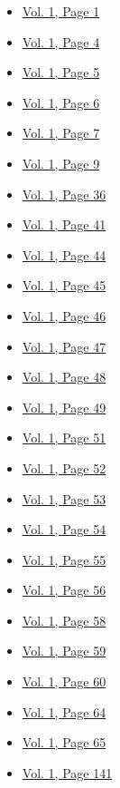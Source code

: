 \begin{itemize}
  \begin{itemize}
  \tightlist
  \item
    \protect\hyperlink{g-page-9}{Vol. 1, Page 1}
  \item
    \protect\hyperlink{g-page-12}{Vol. 1, Page 4}
  \item
    \protect\hyperlink{g-page-13}{Vol. 1, Page 5}
  \item
    \protect\hyperlink{g-page-14}{Vol. 1, Page 6}
  \item
    \protect\hyperlink{g-page-15}{Vol. 1, Page 7}
  \item
    \protect\hyperlink{g-page-17}{Vol. 1, Page 9}
  \item
    \protect\hyperlink{g-page-44}{Vol. 1, Page 36}
  \item
    \protect\hyperlink{g-page-49}{Vol. 1, Page 41}
  \item
    \protect\hyperlink{g-page-52}{Vol. 1, Page 44}
  \item
    \protect\hyperlink{g-page-53}{Vol. 1, Page 45}
  \item
    \protect\hyperlink{g-page-54}{Vol. 1, Page 46}
  \item
    \protect\hyperlink{g-page-55}{Vol. 1, Page 47}
  \item
    \protect\hyperlink{g-page-56}{Vol. 1, Page 48}
  \item
    \protect\hyperlink{g-page-57}{Vol. 1, Page 49}
  \item
    \protect\hyperlink{g-page-59}{Vol. 1, Page 51}
  \item
    \protect\hyperlink{g-page-60}{Vol. 1, Page 52}
  \item
    \protect\hyperlink{g-page-61}{Vol. 1, Page 53}
  \item
    \protect\hyperlink{g-page-62}{Vol. 1, Page 54}
  \item
    \protect\hyperlink{g-page-63}{Vol. 1, Page 55}
  \item
    \protect\hyperlink{g-page-64}{Vol. 1, Page 56}
  \item
    \protect\hyperlink{g-page-66}{Vol. 1, Page 58}
  \item
    \protect\hyperlink{g-page-67}{Vol. 1, Page 59}
  \item
    \protect\hyperlink{g-page-68}{Vol. 1, Page 60}
  \item
    \protect\hyperlink{g-page-72}{Vol. 1, Page 64}
  \item
    \protect\hyperlink{g-page-73}{Vol. 1, Page 65}
  \item
    \protect\hyperlink{g-page-149}{Vol. 1, Page 141}

\end{itemize}
\end{itemize}
